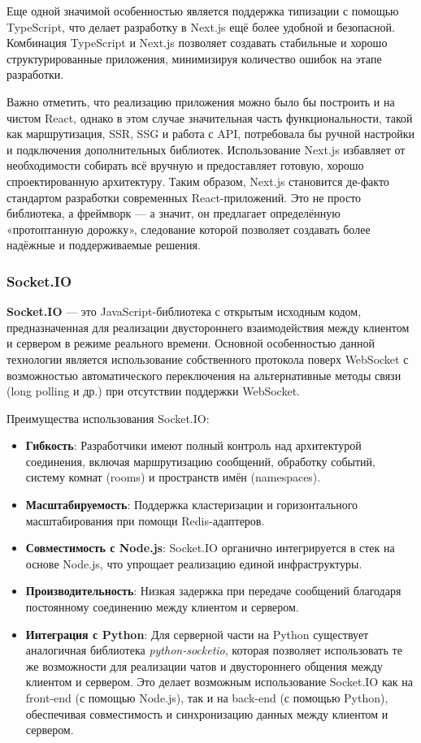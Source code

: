 Еще одной значимой особенностью является поддержка типизации с помощью TypeScript, что делает разработку в Next.js ещё более удобной и безопасной. Комбинация TypeScript и Next.js позволяет создавать стабильные и хорошо структурированные приложения, минимизируя количество ошибок на этапе разработки.

Важно отметить, что реализацию приложения можно было бы построить и на чистом React, однако в этом случае значительная часть функциональности, такой как маршрутизация, SSR, SSG и работа с API, потребовала бы ручной настройки и подключения дополнительных библиотек. Использование Next.js избавляет от необходимости собирать всё вручную и предоставляет готовую, хорошо спроектированную архитектуру. Таким образом, Next.js становится де-факто стандартом разработки современных React-приложений. Это не просто библиотека, а фреймворк — а значит, он предлагает определённую «протоптанную дорожку», следование которой позволяет создавать более надёжные и поддерживаемые решения.

\subsubsection*{Socket.IO}

\textbf{Socket.IO} --- это JavaScript-библиотека с открытым исходным кодом, предназначенная для реализации двустороннего взаимодействия между клиентом и сервером в режиме реального времени. Основной особенностью данной технологии является использование собственного протокола поверх WebSocket с возможностью автоматического переключения на альтернативные методы связи (long polling и др.) при отсутствии поддержки WebSocket.

Преимущества использования Socket.IO:
\begin{itemize}
    \item \textbf{Гибкость}: Разработчики имеют полный контроль над архитектурой соединения, включая маршрутизацию сообщений, обработку событий, систему комнат (rooms) и пространств имён (namespaces).
    \item \textbf{Масштабируемость}: Поддержка кластеризации и горизонтального масштабирования при помощи Redis-адаптеров.
    \item \textbf{Совместимость с Node.js}: Socket.IO органично интегрируется в стек на основе Node.js, что упрощает реализацию единой инфраструктуры.
    \item \textbf{Производительность}: Низкая задержка при передаче сообщений благодаря постоянному соединению между клиентом и сервером.
    \item \textbf{Интеграция с Python}: Для серверной части на Python существует аналогичная библиотека \textit{python-socketio}, которая позволяет использовать те же возможности для реализации чатов и двустороннего общения между клиентом и сервером. Это делает возможным использование Socket.IO как на front-end (с помощью Node.js), так и на back-end (с помощью Python), обеспечивая совместимость и синхронизацию данных между клиентом и сервером.
\end{itemize}

